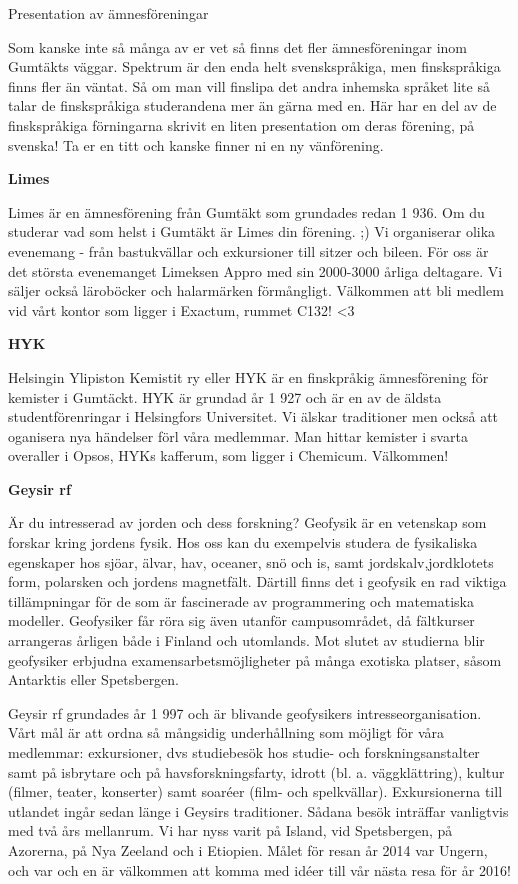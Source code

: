 \documentclass{spektraklet}
\begin{document}
\begin{artikel}{Presentation av ämnesföreningar}{}

Som kanske inte så många av er vet så finns det fler ämnesföreningar inom Gumtäkts
väggar. Spektrum är den enda helt svenskspråkiga, men finskspråkiga finns fler än väntat. Så
om man vill finslipa det andra inhemska språket lite så talar de finskspråkiga studerandena
mer än gärna med en. Här har en del av de finskspråkiga förningarna skrivit en liten
presentation om deras förening, på svenska! Ta er en titt och kanske finner ni en ny
vänförening.

\textbf{Limes}

Limes är en ämnesförening från Gumtäkt som grundades redan 1 936.
Om du studerar vad som helst i Gumtäkt är Limes din förening. ;)
Vi organiserar olika evenemang - från bastukvällar och exkursioner till sitzer och bileen.
För oss är det största evenemanget Limeksen Appro med sin 2000-3000 årliga deltagare.
Vi säljer också läroböcker och halarmärken förmångligt.
Välkommen att bli medlem vid vårt kontor som ligger i Exactum, rummet C132! <3

\textbf{HYK}

Helsingin Ylipiston Kemistit ry eller HYK är en finskpråkig ämnesförening för kemister i
Gumtäckt.
HYK är grundad år 1 927 och är en av de äldsta studentförenringar i Helsingfors
Universitet.
Vi älskar traditioner men också att oganisera nya händelser förl våra medlemmar.
Man hittar kemister i svarta overaller i Opsos, HYKs kafferum, som ligger i Chemicum.
Välkommen!

\textbf{Geysir rf}

Är du intresserad av jorden och dess forskning? Geofysik är en vetenskap som forskar kring jordens fysik. Hos oss kan du exempelvis studera de fysikaliska egenskaper hos sjöar, älvar, hav, oceaner, snö och is, samt jordskalv,jordklotets form, polarsken och jordens magnetfält. Därtill finns det i geofysik en rad viktiga tillämpningar för de som är fascinerade av programmering och matematiska modeller. Geofysiker får röra sig även utanför campusområdet, då fältkurser arrangeras årligen både i Finland och utomlands. Mot slutet av studierna blir geofysiker erbjudna examensarbetsmöjligheter på många exotiska platser, såsom Antarktis eller Spetsbergen.

Geysir rf grundades år 1 997 och är blivande geofysikers intresseorganisation. Vårt mål är
att ordna så mångsidig underhållning som möjligt för våra medlemmar: exkursioner, dvs
studiebesök hos studie- och forskningsanstalter samt på isbrytare och på havsforskningsfarty, idrott (bl. a. väggklättring), kultur (filmer, teater, konserter) samt soaréer (film- och spelkvällar). Exkursionerna till utlandet ingår sedan länge i Geysirs traditioner. Sådana besök inträffar vanligtvis med två års mellanrum. Vi har nyss varit på Island, vid Spetsbergen, på Azorerna, på Nya Zeeland och i Etiopien. Målet för resan år 2014 var Ungern, och var och en är välkommen att komma med idéer till vår nästa resa för år 2016!


\end{artikel}
\end{document}
